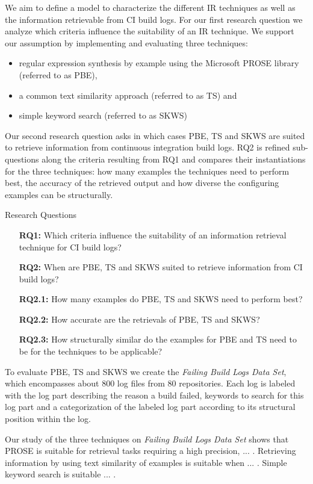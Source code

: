 \documentclass[\myrootdir/main.tex]{subfiles}
\begin{document}
We aim to define a model to characterize the different IR techniques as well as the information retrievable from CI build logs.
For our first research question we analyze which criteria influence the suitability of an IR technique.
We support our assumption by implementing and evaluating three techniques:
\begin{itemize}
  \item regular expression synthesis by example using the Microsoft PROSE library (referred to as PBE),
  \item a common text similarity approach (referred to as TS) and
  \item simple keyword search (referred to as SKWS)
\end{itemize}
Our second research question asks in which cases PBE, TS and SKWS are suited to retrieve information from continuous integration build logs. RQ2 is refined sub-questions along the criteria resulting from RQ1 and compares their instantiations for the three techniques: how many examples the techniques need to perform best, the accuracy of the retrieved output and how diverse the configuring examples can be structurally.
\begin{simplebox}{Research Questions}
\begin{itemize}
  \item[\textbf{RQ1:}] Which criteria influence the suitability of an information retrieval technique for CI build logs?
  \item[\textbf{RQ2:}] When are PBE, TS and SKWS suited to retrieve information from CI build logs?
  \item[\textbf{RQ2.1:}] How many examples do PBE, TS and SKWS need to perform best?
  \item[\textbf{RQ2.2:}] How accurate are the retrievals of PBE, TS and SKWS?
  \item[\textbf{RQ2.3:}] How structurally similar do the examples for PBE and TS need to be for the techniques to be applicable?
\end{itemize}
\end{simplebox}
To evaluate PBE, TS and SKWS we create the \emph{Failing Build Logs Data Set}, which encompasses about 800 log files from 80 repositories. Each log is labeled with the log part describing the reason a build failed, keywords to search for this log part and a categorization of the labeled log part according to its structural position within the log. 



Our study of the three techniques on \emph{Failing Build Logs Data Set} shows that PROSE is suitable for retrieval tasks requiring a high precision, ... . Retrieving information by using text similarity of examples is suitable when ... . Simple keyword search is suitable ... .
\end{document}
